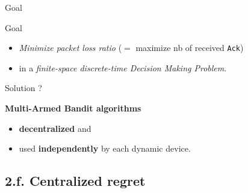 \documentclass[12pt,english,ignorenonframetext,aspectratio=169,]{beamer}
\providecommand{\tightlist}{%
  \setlength{\itemsep}{0pt}\setlength{\parskip}{0pt}}
\begin{document}
\begin{frame}{Goal}

\begin{block}{Goal}
  \begin{itemize}\tightlist
    \item
    \emph{Minimize packet loss ratio} \newline
    (\(=\) maximize nb of received \texttt{Ack})
    \item
    in a \emph{finite-space discrete-time Decision Making Problem}.
  \end{itemize}
\end{block}

\vspace*{20pt}

\pause

\begin{block}{Solution ?}

  \textbf{Multi-Armed Bandit algorithms}
  \begin{itemize}\tightlist
    \item
    \textbf{decentralized} and
    \item
    used \textbf{independently} by each dynamic device.
  \end{itemize}


\end{block}




\end{frame}


\subsection{\hfill{}2.f. Centralized regret\hfill{}}
\end{document}
